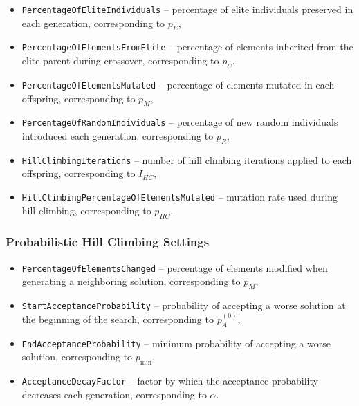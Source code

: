 \begin{itemize}
    \item \texttt{PercentageOfEliteIndividuals} -- percentage of elite individuals preserved in each generation, corresponding to $p_E$,
    
    \item \texttt{PercentageOfElementsFromElite} -- percentage of elements inherited from the elite parent during crossover, corresponding to $p_C$,
    
    \item \texttt{PercentageOfElementsMutated} -- percentage of elements mutated in each offspring, corresponding to $p_M$,
    
    \item \texttt{PercentageOfRandomIndividuals} -- percentage of new random individuals introduced each generation, corresponding to $p_R$,
    
    \item \texttt{HillClimbingIterations} -- number of hill climbing iterations applied to each offspring, corresponding to $I_{HC}$,
    
    \item \texttt{HillClimbingPercentageOfElementsMutated} -- mutation rate used during hill climbing, corresponding to $p_{HC}$.
\end{itemize}

\subsubsection{Probabilistic Hill Climbing Settings}

\begin{itemize}
    \item \texttt{PercentageOfElementsChanged} -- percentage of elements modified when generating a neighboring solution, corresponding to $p_M$,
    
    \item \texttt{StartAcceptanceProbability} -- probability of accepting a worse solution at the beginning of the search, corresponding to $p_A^{(0)}$,
    
    \item \texttt{EndAcceptanceProbability} -- minimum probability of accepting a worse solution, corresponding to $p_{\min}$,
    
    \item \texttt{AcceptanceDecayFactor} -- factor by which the acceptance probability decreases each generation, corresponding to $\alpha$.
\end{itemize}


